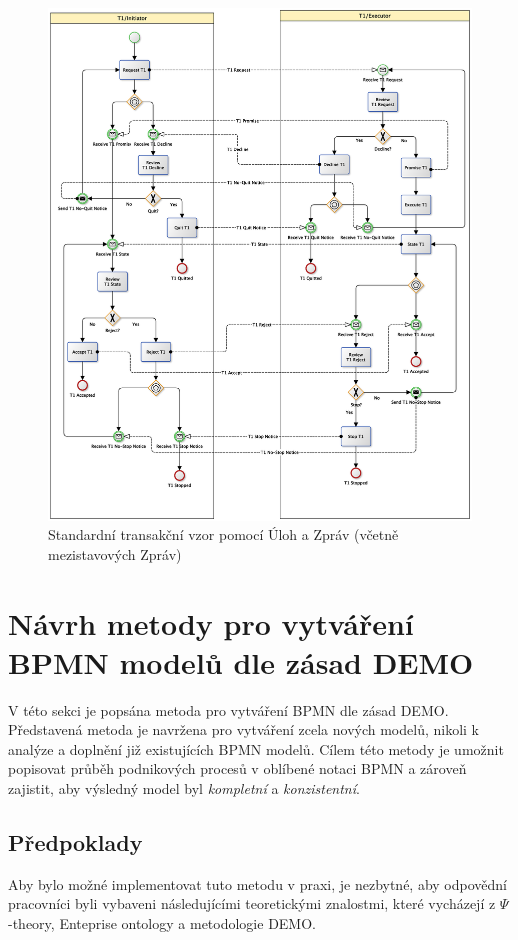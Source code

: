 \documentclass[]{article}
\newcommand{\ptheory}{$\Psi$-theory}
\begin{document}
\begin{figure}[H]\centering
\includegraphics[width=\textwidth,height=\textheight,keepaspectratio]{obrazky/transaction-standard-messages}
\caption{Standardní transakční vzor pomocí Úloh a Zpráv (včetně mezistavových Zpráv)}
\label{fig:St_trans_ulohy_zpravy_mezistav}
\end{figure}

\section{Návrh metody pro vytváření BPMN modelů dle zásad DEMO}
V této sekci je popsána metoda pro vytváření BPMN dle zásad DEMO. Představená metoda je navržena pro vytváření zcela nových modelů, nikoli k analýze a doplnění již existujících BPMN modelů. Cílem této metody je umožnit popisovat průběh podnikových procesů v oblíbené notaci BPMN a zároveň zajistit, aby výsledný model byl \textit{kompletní} a \textit{konzistentní}.

\subsection{Předpoklady}
Aby bylo možné implementovat tuto metodu v praxi, je nezbytné, aby odpovědní pracovníci byli vybaveni následujícími teoretickými znalostmi, které vycházejí z \ptheory, Enteprise ontology a metodologie DEMO.
\end{document}

